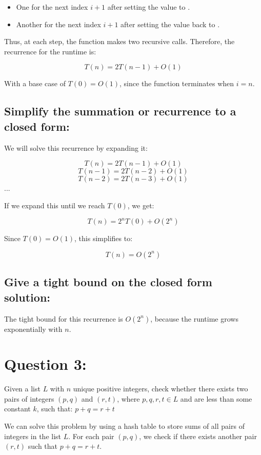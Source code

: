 \documentclass{article}
\begin{document}
\begin{itemize}
    \item One for the next index \( i+1 \) after setting the value to .
    \item Another for the next index \( i+1 \) after setting the value back to .
\end{itemize}

Thus, at each step, the function makes two recursive calls. Therefore, the recurrence for the runtime is:

\[T(n) = 2T(n-1) + O(1)\]

With a base case of \( T(0) = O(1) \), since the function terminates when \( i = n \).


\subsection*{Simplify the summation or recurrence to a closed form:}


We will solve this recurrence by expanding it:

\[T(n) = 2T(n-1) + O(1)\]
\[T(n-1) = 2T(n-2) + O(1)\]
\[T(n-2) = 2T(n-3) + O(1)\]
...

If we expand this until we reach \( T(0) \), we get:

\[T(n) = 2^n T(0) + O(2^n)\]

Since \( T(0) = O(1) \), this simplifies to:

\[T(n) = O(2^n)\]

\subsection*{Give a tight bound on the closed form solution:}

The tight bound for this recurrence is \( O(2^n) \), because the runtime grows exponentially with \( n \).

\pagebreak
\section*{Question 3:}
Given a list \( L \) with \( n \) unique positive integers, check whether there exists two pairs of integers \( (p, q) \) and \( (r, t) \), where \( p, q, r, t \in L \) and are less than some constant \( k \), such that: \(p + q = r + t\)

We can solve this problem by using a hash table to store sums of all pairs of integers in the list \( L \). For each pair \( (p, q) \), we check if there exists another pair \( (r, t) \) such that \( p + q = r + t \).
\end{document}
